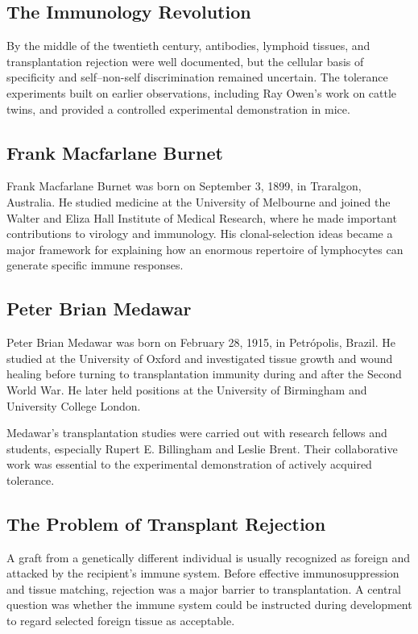 \subsection{The Immunology Revolution}

By the middle of the twentieth century, antibodies, lymphoid tissues, and transplantation rejection were well documented, but the cellular basis of specificity and self--non-self discrimination remained uncertain. The tolerance experiments built on earlier observations, including Ray Owen's work on cattle twins, and provided a controlled experimental demonstration in mice.

\subsection{Frank Macfarlane Burnet}

Frank Macfarlane Burnet was born on September 3, 1899, in Traralgon, Australia. He studied medicine at the University of Melbourne and joined the Walter and Eliza Hall Institute of Medical Research, where he made important contributions to virology and immunology. His clonal-selection ideas became a major framework for explaining how an enormous repertoire of lymphocytes can generate specific immune responses.

\subsection{Peter Brian Medawar}

Peter Brian Medawar was born on February 28, 1915, in Petr\'opolis, Brazil. He studied at the University of Oxford and investigated tissue growth and wound healing before turning to transplantation immunity during and after the Second World War. He later held positions at the University of Birmingham and University College London.

Medawar's transplantation studies were carried out with research fellows and students, especially Rupert E. Billingham and Leslie Brent. Their collaborative work was essential to the experimental demonstration of actively acquired tolerance.

\subsection{The Problem of Transplant Rejection}

A graft from a genetically different individual is usually recognized as foreign and attacked by the recipient's immune system. Before effective immunosuppression and tissue matching, rejection was a major barrier to transplantation. A central question was whether the immune system could be instructed during development to regard selected foreign tissue as acceptable.

